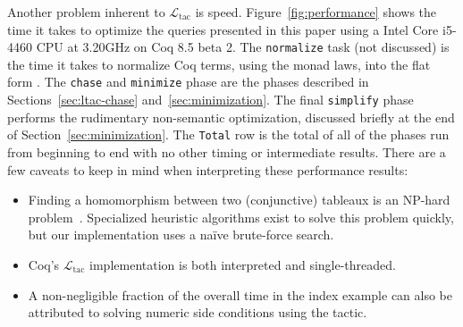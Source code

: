 \documentclass[preprint]{sigplanconf}
\newcommand{\ltac}[0]{\ensuremath{\mathcal{L}_{\mathrm{tac}}}}
\begin{document}
Another problem inherent to \ltac{} is speed.
Figure~\ref{fig:performance} shows the time it takes to optimize the queries presented in this paper using a Intel Core i5-4460  CPU at 3.20GHz on Coq 8.5 beta 2.  The {\tt normalize} task (not discussed) is the time it takes to normalize Coq terms, using the monad laws, into the flat form .
The {\tt chase} and {\tt minimize} phase are the phases described in Sections~\ref{sec:ltac-chase} and~\ref{sec:minimization}.  The final {\tt simplify} phase performs the rudimentary non-semantic optimization, discussed briefly at the end of Section~\ref{sec:minimization}.  The {\tt Total} row is the total of all of the phases run from beginning to end with no other timing or intermediate results.
There are a few caveats to keep in mind when interpreting these performance results:
\begin{itemize}

\item Finding a homomorphism between two (conjunctive) tableaux is an NP-hard problem~\cite{Deutsch:2006:QRC:1121995.1122010}.  Specialized heuristic algorithms exist to solve this problem quickly, but our implementation uses a na\"ive brute-force search.

\item Coq's \ltac{} implementation is both interpreted and single-threaded.

\item A non-negligible fraction of the overall time in the index example can also be attributed to solving numeric side conditions using the  tactic.


\end{itemize}





\end{document}
